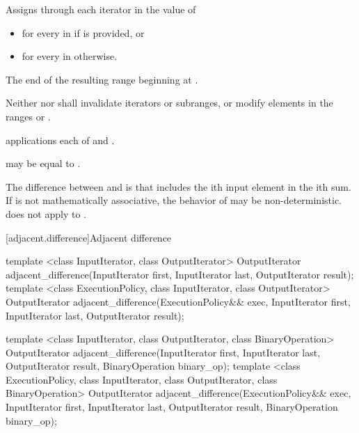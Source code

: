 \begin{itemdescr}
\pnum
\effects
Assigns through each iterator  in  the value of
\begin{itemize}
\item
{}
for every  in 
if  is provided, or
\item
{}
for every  in  otherwise.
\end{itemize}

\pnum
\returns
The end of the resulting range beginning at .

\pnum
\requires
Neither  nor  shall invalidate iterators or
subranges, or modify elements in the ranges  or
.

\pnum
\complexity
{} applications each of  and
.

\pnum
\remarks
{} may be equal to .

\pnum
\realnotes
The difference between  and
 is that 
includes the ith input element in the ith sum. If  is not
mathematically associative, the behavior of 
may be non-deterministic.  does not apply
 to .
\end{itemdescr}

[adjacent.difference]{Adjacent difference}

%
\begin{itemdecl}
template <class InputIterator, class OutputIterator>
  OutputIterator
    adjacent_difference(InputIterator first, InputIterator last,
                        OutputIterator result);
template <class ExecutionPolicy, class InputIterator, class OutputIterator>
  OutputIterator
    adjacent_difference(ExecutionPolicy&& exec,
                        InputIterator first, InputIterator last,
                        OutputIterator result);

template <class InputIterator, class OutputIterator, class BinaryOperation>
  OutputIterator
    adjacent_difference(InputIterator first, InputIterator last,
                        OutputIterator result,
                        BinaryOperation binary_op);
template <class ExecutionPolicy, class InputIterator, class OutputIterator, class BinaryOperation>
  OutputIterator
    adjacent_difference(ExecutionPolicy&& exec,
                        InputIterator first, InputIterator last,
                        OutputIterator result,
                        BinaryOperation binary_op);
\end{itemdecl}

